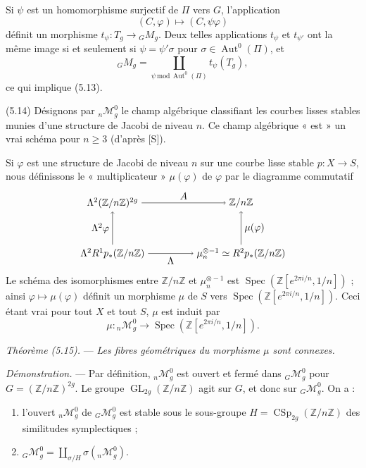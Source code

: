 \documentclass[10pt]{article}
\newcommand{\Spec}{\operatorname{Spec}}
\newcommand{\Aut}{\operatorname{Aut}}
\begin{document}
Si $\psi$ est un homomorphisme surjectif de $\Pi$ vers $G$, l'application
\[
(C,\varphi)\longmapsto (C,\psi\varphi)
\]
définit un morphisme $t_\psi:T_g\to{}_GM_g$. Deux telles applications $t_\psi$ et $t_{\psi'}$ ont la même image si et seulement si $\psi=\psi'\sigma$ pour $\sigma\in\Aut^0(\Pi)$, et
\[
{}_GM_g=\coprod_{\psi\,\mathrm{mod}\,\Aut^0(\Pi)} t_\psi(T_g),
\]
ce qui implique (5.13).

\medskip
\noindent(5.14) Désignons par ${}_n\mathcal M_g^0$ le champ algébrique classifiant les courbes lisses stables munies d'une structure de Jacobi de niveau $n$. Ce champ algébrique « est » un vrai schéma pour $n\geq3$ (d'après [S]).

Si $\varphi$ est une structure de Jacobi de niveau $n$ sur une courbe lisse stable $p:X\to S$, nous définissons le « multiplicateur » $\mu(\varphi)$ de $\varphi$ par le diagramme commutatif
\[
\begin{tikzpicture}[baseline=(current bounding box.center)]
\node (A) at (0,1.8) {$\Lambda^2(\mathbb Z/n\mathbb Z)^{2g}$};
\node (B) at (4.6,1.8) {$\mathbb Z/n\mathbb Z$};
\node (C) at (0,0) {$\Lambda^2R^1p_*(\mathbb Z/n\mathbb Z)$};
\node (D) at (4.6,0) {$\mu_n^{\otimes -1}\simeq R^2p_*(\mathbb Z/n\mathbb Z)$};
\draw[->] (A) -- node[above] {$A$} (B);
\draw[->] (C) -- node[below] {$\Lambda$} (D);
\draw[->] (C) -- node[left] {$\Lambda^2\varphi$} (A);
\draw[->] (D) -- node[right] {$\mu(\varphi)$} (B);
\end{tikzpicture}
\]
Le schéma des isomorphismes entre $\mathbb Z/n\mathbb Z$ et $\mu_n^{\otimes -1}$ est $\Spec(\mathbb Z[e^{2\pi i/n},1/n])$ ; ainsi $\varphi\mapsto\mu(\varphi)$ définit un morphisme $\mu$ de $S$ vers $\Spec(\mathbb Z[e^{2\pi i/n},1/n])$. Ceci étant vrai pour tout $X$ et tout $S$, $\mu$ est induit par
\[
\mu:{}_n\mathcal M_g^0\longrightarrow \Spec(\mathbb Z[e^{2\pi i/n},1/n]).
\]

\medskip
\noindent\emph{Théorème (5.15).} --- \emph{Les fibres géométriques du morphisme $\mu$ sont connexes.}

\noindent\emph{Démonstration.} --- Par définition, ${}_n\mathcal M_g^0$ est ouvert et fermé dans ${}_G\mathcal M_g^0$ pour $G=(\mathbb Z/n\mathbb Z)^{2g}$. Le groupe $\operatorname{GL}_{2g}(\mathbb Z/n\mathbb Z)$ agit sur $G$, et donc sur ${}_G\mathcal M_g^0$. On a :
\begin{enumerate}[label=(\roman*)]
\item l'ouvert ${}_n\mathcal M_g^0$ de ${}_G\mathcal M_g^0$ est stable sous le sous-groupe $H=\operatorname{CSp}_{2g}(\mathbb Z/n\mathbb Z)$ des similitudes symplectiques ;
\item ${}_G\mathcal M_g^0=\coprod_{\sigma/H}\sigma({}_n\mathcal M_g^0)$.
\end{enumerate}
\end{document}
